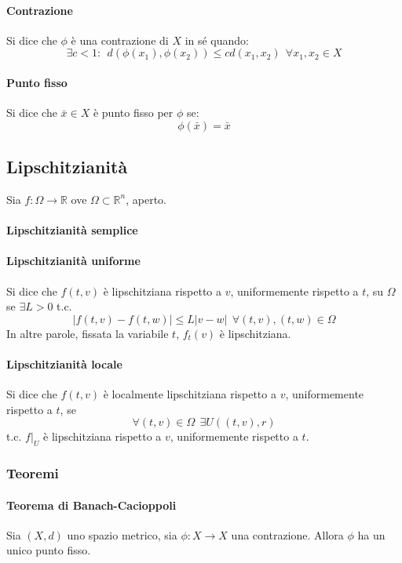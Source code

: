 \documentclass[a4paper,12pt]{article}
\begin{document}
\paragraph{Contrazione}
Si dice che $\phi$ è una contrazione di $X$ in sé quando:
$$\exists c < 1:\ \ d(\phi(x_1), \phi(x_2)) \leq cd(x_1, x_2)\ \ \forall x_1, x_2 \in X$$
\paragraph{Punto fisso}
Si dice che $\bar{x}\in X$ è punto fisso per $\phi$ se:
$$\phi(\bar{x})=\bar{x}$$

\subsection{Lipschitzianità}
Sia $f:\Omega\rightarrow\mathbb{R}$ ove $\Omega\subset\mathbb{R}^n$, aperto.
\paragraph{Lipschitzianità semplice}

\paragraph{Lipschitzianità uniforme}
Si dice che $f(t, v)$ è lipschitziana rispetto a $v$, uniformemente rispetto a $t$, su $\Omega$ se $\exists L>0$ t.c.
$$|f(t, v) - f(t, w)| \leq L|v-w|\ \ \forall (t,v), (t, w) \in \Omega$$
In altre parole, fissata la variabile $t$, $f_t(v)$ è lipschitziana.

\paragraph{Lipschitzianità locale}
Si dice che $f(t, v)$ è localmente lipschitziana rispetto a $v$, uniformemente rispetto a $t$, se
$$\forall(t, v)\in \Omega\ \ \exists U((t, v), r)$$
t.c. $f|_U$ è lipschitziana rispetto a $v$, uniformemente rispetto a $t$.


\subsubsection{Teoremi}
\paragraph{Teorema di Banach-Cacioppoli}
Sia $(X, d)$ uno spazio metrico, sia $\phi : X\rightarrow X$ una contrazione.
Allora $\phi$ ha un unico punto fisso.
\end{document}
